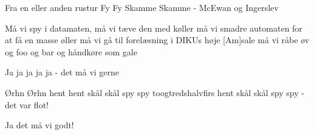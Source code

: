 {Fra en eller anden rustur}
{Fy Fy Skamme Skamme - McEwan og Ingerslev}
{
Må vi spy i datamaten,
må vi tæve den med køller
må vi smadre automaten 
for at få en masse øller
må vi gå til forelæsning 
i DIKUs høje [Am]sale
må vi råbe øv og foo og bar
og håndkøre som gale

Ja ja ja ja ja - det må vi gerne

Ørhn Ørhn hent hent skål skål spy spy
toogtredshalvfirs hent skål skål spy spy 
- det var flot!

Ja det må vi godt!

\\
}

%
%

%

%

% 

%
